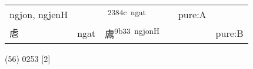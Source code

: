 \documentclass[14pt,a4paper]{scrartcl}
\begin{document}
\begin{longtable}[c]{@{}llllll@{}}
\begin{minipage}[t]{0.14\columnwidth}
ngjon, ngjenH
\strut\end{minipage} &
\begin{minipage}[t]{0.14\columnwidth}\raggedright\strut
\strut\end{minipage} &
\begin{minipage}[t]{0.14\columnwidth}\raggedright\strut
𣡌\textsuperscript{2384c~ngat}
\strut\end{minipage} &
\begin{minipage}[t]{0.14\columnwidth}\raggedright\strut
\strut\end{minipage} &
\begin{minipage}[t]{0.14\columnwidth}\raggedright\strut
pure:A
\strut\end{minipage}\tabularnewline
\begin{minipage}[t]{0.14\columnwidth}\raggedright\strut
䖈
\strut\end{minipage} &
\begin{minipage}[t]{0.14\columnwidth}\raggedright\strut
ngat
\strut\end{minipage} &
\begin{minipage}[t]{0.14\columnwidth}\raggedright\strut
鬳\textsuperscript{9b33~ngjonH}
\strut\end{minipage} &
\begin{minipage}[t]{0.14\columnwidth}\raggedright\strut
\strut\end{minipage} &
\begin{minipage}[t]{0.14\columnwidth}\raggedright\strut
\strut\end{minipage} &
\begin{minipage}[t]{0.14\columnwidth}\raggedright\strut
pure:B
\strut\end{minipage}\tabularnewline
\bottomrule
\end{longtable}

(56) 0253 {[}2{]}
\end{document}
